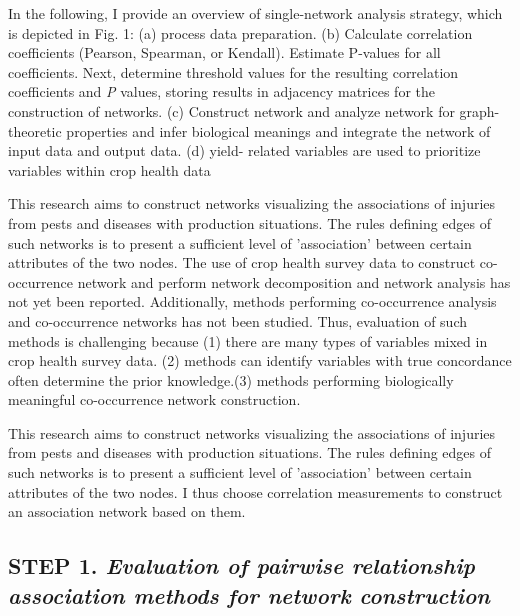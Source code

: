 In the following, I provide an overview of single-network analysis strategy, which is depicted in Fig. 1: (a) process data preparation. (b) Calculate correlation coefficients (Pearson, Spearman, or Kendall). Estimate P-values for all coefficients. Next, determine threshold values for the resulting correlation coefficients and \textit{P} values, storing results in adjacency matrices for the construction of networks. (c) Construct network and analyze network for graph-theoretic properties and infer biological meanings and integrate the network of input data and output data. (d) yield- related variables are used to prioritize variables within crop health data 

This research aims to construct networks visualizing the associations of injuries from pests and diseases with production situations. The rules defining edges of such networks is to present a sufficient level of 'association' between certain attributes of the two nodes. The use of crop health survey data to construct co-occurrence network and perform network decomposition and network analysis has not yet been reported. Additionally, methods performing co-occurrence analysis and co-occurrence networks has not been studied. Thus, evaluation of such methods is challenging because (1) there are many types of variables mixed in crop health survey data. (2) methods can identify variables with true concordance often determine the prior knowledge.(3) methods performing biologically meaningful co-occurrence network construction. 

This research aims to construct networks visualizing the associations of injuries from pests and diseases with production situations. The rules defining edges of such networks is to present a sufficient level of 'association' between certain attributes of the two nodes. I thus choose correlation measurements to construct an association network based on them.


\subsection*{\textbf{STEP 1. }\textit{Evaluation of pairwise relationship association methods for network construction}}


